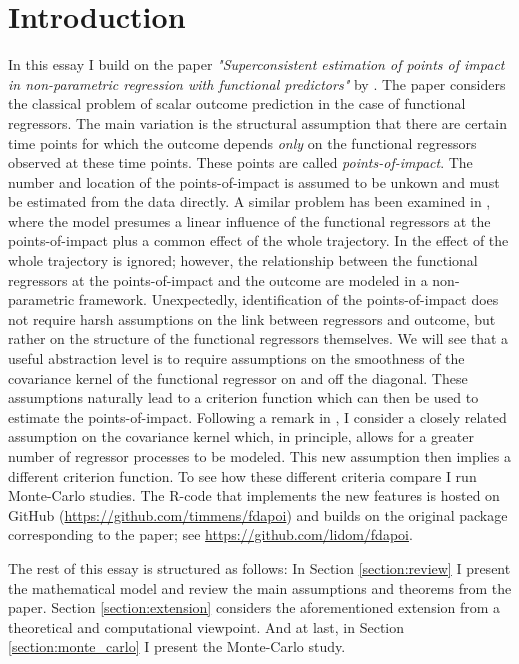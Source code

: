 \section{Introduction}

In this essay I build on the paper \emph{"Superconsistent estimation of points of impact
in non-parametric regression with functional predictors"} by \cite{Kneip2020}. The paper
considers the classical problem of scalar outcome prediction in the case of functional
regressors. The main variation is the structural assumption that there are certain time
points for which the outcome depends \emph{only} on the functional regressors observed
at these time points. These points are called \emph{points-of-impact}. The number and
location of the points-of-impact is assumed to be unkown and must be estimated from the
data directly. A similar problem has been examined in \cite{Kneip2016}, where the model
presumes a linear influence of the functional regressors at the points-of-impact plus a
common effect of the whole trajectory. In \cite{Kneip2020} the effect of the whole
trajectory is ignored; however, the relationship between the functional regressors at
the points-of-impact and the outcome are modeled in a non-parametric framework.
Unexpectedly, identification of the points-of-impact does not require harsh assumptions
on the link between regressors and outcome, but rather on the structure of the
functional regressors themselves. We will see that a useful abstraction level is to
require assumptions on the smoothness of the covariance kernel of the functional
regressor on and off the diagonal. These assumptions naturally lead to a criterion
function which can then be used to estimate the points-of-impact. Following a remark in
\cite{Kneip2020}, I consider a closely related assumption on the covariance kernel
which, in principle, allows for a greater number of regressor processes to be modeled.
This new assumption then implies a different criterion function. To see how these
different criteria compare I run Monte-Carlo studies. The \textsf{R}-code that
implements the new features is hosted on GitHub
(\url{https://github.com/timmens/fdapoi}) and builds on the original package
corresponding to the paper; see \url{https://github.com/lidom/fdapoi}.

The rest of this essay is structured as follows: In Section \ref{section:review} I
present the mathematical model and review the main assumptions and theorems from the
paper. Section \ref{section:extension} considers the aforementioned extension from a
theoretical and computational viewpoint. And at last, in Section
\ref{section:monte_carlo} I present the Monte-Carlo study.
